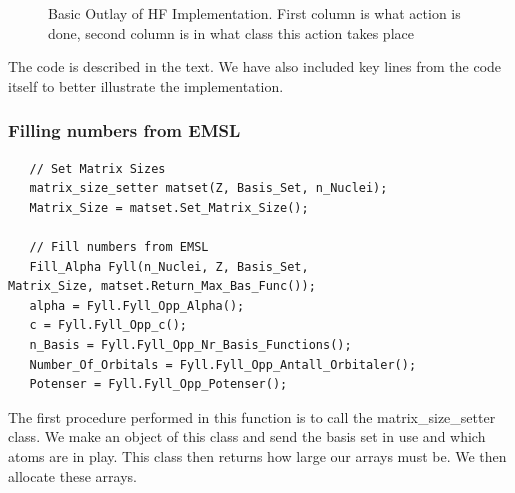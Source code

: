 \documentclass[a4paper,norsk,11pt,twoside]{report}
\begin{document}
\begin{figure}[h!]
\begin{center}
\caption{Basic Outlay of HF Implementation. First column is what action is done, second column is in what class this action takes place}
\label{fig:hfimp}
\end{center}
\end{figure}

The code is described in the text. We have also included key lines from the code itself to better illustrate the implementation. \\

\subsubsection{Filling numbers from EMSL}
\begin{lstlisting}
   // Set Matrix Sizes
   matrix_size_setter matset(Z, Basis_Set, n_Nuclei);
   Matrix_Size = matset.Set_Matrix_Size();

   // Fill numbers from EMSL
   Fill_Alpha Fyll(n_Nuclei, Z, Basis_Set,
Matrix_Size, matset.Return_Max_Bas_Func());
   alpha = Fyll.Fyll_Opp_Alpha();
   c = Fyll.Fyll_Opp_c();
   n_Basis = Fyll.Fyll_Opp_Nr_Basis_Functions();
   Number_Of_Orbitals = Fyll.Fyll_Opp_Antall_Orbitaler();
   Potenser = Fyll.Fyll_Opp_Potenser();
\end{lstlisting}

The first procedure performed in this function is to call the matrix\_size\_setter class. We make an object of this class and send the basis set in use and which atoms are in play. This class then returns how large our arrays must be. We then allocate these arrays. \\
\end{document}
